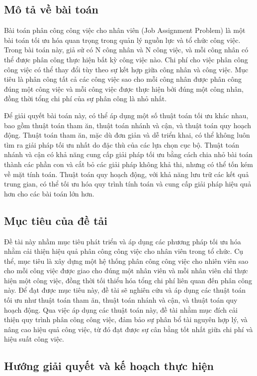 {}
\setcounter{section}{1}

\subsection{Mô tả về bài toán}
Bài toán phân công công việc cho nhân viên (Job Assignment Problem) là một bài toán tối ưu hóa quan trọng trong quản lý nguồn lực và tổ chức công việc. Trong bài toán này, giả sử có N công nhân và N công việc, và mỗi công nhân có thể được phân công thực hiện bất kỳ công việc nào. Chi phí cho việc phân công công việc có thể thay đổi tùy theo sự kết hợp giữa công nhân và công việc. Mục tiêu là phân công tất cả các công việc sao cho mỗi công nhân được phân công đúng một công việc và mỗi công việc được thực hiện bởi đúng một công nhân, đồng thời tổng chi phí của sự phân công là nhỏ nhất.

Để giải quyết bài toán này, có thể áp dụng một số thuật toán tối ưu khác nhau, bao gồm thuật toán tham ăn, thuật toán nhánh và cận, và thuật toán quy hoạch động. Thuật toán tham ăn, mặc dù đơn giản và dễ triển khai, có thể không luôn tìm ra giải pháp tối ưu nhất do đặc thù của các lựa chọn cục bộ. Thuật toán nhánh và cận có khả năng cung cấp giải pháp tối ưu bằng cách chia nhỏ bài toán thành các phần con và cắt bỏ các giải pháp không khả thi, nhưng có thể tốn kém về mặt tính toán. Thuật toán quy hoạch động, với khả năng lưu trữ các kết quả trung gian, có thể tối ưu hóa quy trình tính toán và cung cấp giải pháp hiệu quả hơn cho các bài toán lớn hơn.

\subsection{Mục tiêu của đề tải}
Đề tài này nhầm mục tiêu phát triển và áp dụng các phương pháp tối ưu hóa nhằm cải thiện hiệu quả phân công công việc cho nhân viên trong tổ chức. Cụ thể, mục tiêu là xây dựng một hệ thống phân công công việc cho nhiên viên sao cho mỗi công việc được giao cho đúng một nhân viên và mỗi nhân viên chỉ thực hiện một công việc, đồng thời tối thiểu hóa tổng chi phí liên quan đến phân công này. Để đạt được mục tiêu này, đề tài sẽ nghiên cứu và áp dụng các thuật toán tối ưu như thuật toán tham ăn, thuật toán nhánh và cận, và thuật toán quy hoạch động. Qua việc áp dụng các thuật toán này, đề tài nhằm mục đích cải thiện quy trình phân công công việc, đảm bảo sự phân bổ tài nguyên hợp lý, và nâng cao hiệu quả công việc, từ đó đạt được sự cân bằng tốt nhất giữa chi phí và hiệu suất công việc.

\subsection{Hướng giải quyết và kế hoạch thực hiện}